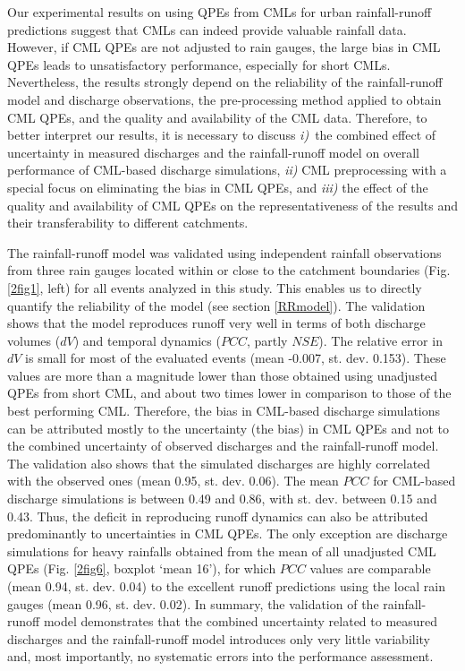 \documentclass{ctuthesis}\usepackage[]{graphicx}\usepackage[]{color}
\begin{document}
Our experimental results on using QPEs from CMLs for urban rainfall-runoff predictions suggest that CMLs can indeed provide valuable rainfall data. However, if CML QPEs are not adjusted to rain gauges, the large bias in CML QPEs leads to unsatisfactory performance, especially for short CMLs. Nevertheless, the results strongly depend on the reliability of the rainfall-runoff model and discharge observations, the pre-processing method applied to obtain CML QPEs, and the quality and availability of the CML data. Therefore, to better interpret our results, it is necessary to discuss \emph{i)}~the combined effect of uncertainty in measured discharges and the rainfall-runoff model on overall performance of CML-based discharge simulations, \emph{ii)} CML preprocessing with a special focus on eliminating the bias in CML QPEs, and \emph{iii)} the effect of the quality and availability of CML QPEs on the representativeness of the results and their transferability to different catchments.

The rainfall-runoff model was validated using independent rainfall observations from three rain gauges located within or close to the catchment boundaries (Fig. \ref{2fig1}, left) for all events analyzed in this study. This enables us to directly quantify the reliability of the model (see section \ref{RRmodel}). The validation shows that the model reproduces runoff very well in terms of both discharge volumes ($dV$) and temporal dynamics ($PCC$, partly $NSE$). The relative error in $dV$ is small for most of the evaluated events (mean -0.007, st. dev. 0.153). These values are more than a magnitude lower than those obtained using unadjusted QPEs from short CML, and about two times lower in comparison to those of the best performing CML. Therefore, the bias in CML-based discharge simulations can be attributed mostly to the uncertainty (the bias) in CML QPEs and not to the combined uncertainty of observed discharges and the rainfall-runoff model. The validation also shows that the simulated discharges are highly correlated with the observed ones (mean 0.95, st. dev. 0.06). The mean $PCC$ for CML-based discharge simulations is between 0.49 and 0.86, with st. dev. between 0.15 and 0.43. Thus, the deficit in reproducing runoff dynamics can also be attributed predominantly to uncertainties in CML QPEs. The only exception are discharge simulations for heavy rainfalls obtained from the mean of all unadjusted CML QPEs (Fig. \ref{2fig6}, boxplot ‘mean 16’), for which $PCC$ values are comparable (mean 0.94, st. dev. 0.04) to the excellent runoff predictions using the local rain gauges (mean 0.96, st. dev. 0.02). In summary, the validation of the rainfall-runoff model demonstrates that the combined uncertainty related to measured discharges and the rainfall-runoff model introduces only very little variability and, most importantly, no systematic errors into the performance assessment.
\end{document}
